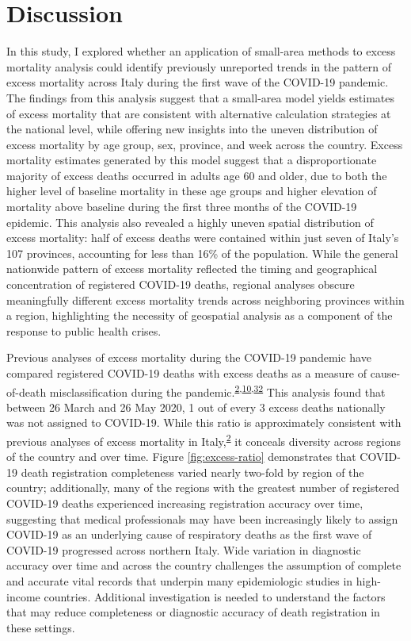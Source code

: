\documentclass[
]{article}
\begin{document}
\hypertarget{discussion}{%
\section{Discussion}\label{discussion}}

In this study, I explored whether an application of small-area methods to excess mortality analysis could identify previously unreported trends in the pattern of excess mortality across Italy during the first wave of the COVID-19 pandemic. The findings from this analysis suggest that a small-area model yields estimates of excess mortality that are consistent with alternative calculation strategies at the national level, while offering new insights into the uneven distribution of excess mortality by age group, sex, province, and week across the country. Excess mortality estimates generated by this model suggest that a disproportionate majority of excess deaths occurred in adults age 60 and older, due to both the higher level of baseline mortality in these age groups and higher elevation of mortality above baseline during the first three months of the COVID-19 epidemic. This analysis also revealed a highly uneven spatial distribution of excess mortality: half of excess deaths were contained within just seven of Italy's 107 provinces, accounting for less than 16\% of the population. While the general nationwide pattern of excess mortality reflected the timing and geographical concentration of registered COVID-19 deaths, regional analyses obscure meaningfully different excess mortality trends across neighboring provinces within a region, highlighting the necessity of geospatial analysis as a component of the response to public health crises.

Previous analyses of excess mortality during the COVID-19 pandemic have compared registered COVID-19 deaths with excess deaths as a measure of cause-of-death misclassification during the pandemic.\textsuperscript{\protect\hyperlink{ref-Alicandro2020}{2},\protect\hyperlink{ref-Weinberger2020a}{10},\protect\hyperlink{ref-Woolf2020}{32}} This analysis found that between 26 March and 26 May 2020, 1 out of every 3 excess deaths nationally was not assigned to COVID-19. While this ratio is approximately consistent with previous analyses of excess mortality in Italy,\textsuperscript{\protect\hyperlink{ref-Alicandro2020}{2}} it conceals diversity across regions of the country and over time. Figure \ref{fig:excess-ratio} demonstrates that COVID-19 death registration completeness varied nearly two-fold by region of the country; additionally, many of the regions with the greatest number of registered COVID-19 deaths experienced increasing registration accuracy over time, suggesting that medical professionals may have been increasingly likely to assign COVID-19 as an underlying cause of respiratory deaths as the first wave of COVID-19 progressed across northern Italy. Wide variation in diagnostic accuracy over time and across the country challenges the assumption of complete and accurate vital records that underpin many epidemiologic studies in high-income countries. Additional investigation is needed to understand the factors that may reduce completeness or diagnostic accuracy of death registration in these settings.
\end{document}
